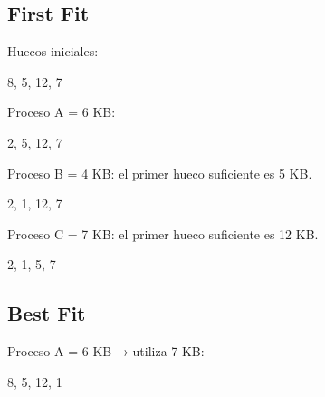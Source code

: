 \documentclass[
  spanish,
  letterpaper,
]{scrbook}
\newenvironment{Shaded}{\begin{snugshade}}{\end{snugshade}}
\newcommand{\NormalTok}[1]{\textcolor[rgb]{0.00,0.23,0.31}{#1}}
\begin{document}
\begin{tcolorbox}[enhanced jigsaw, arc=.35mm, bottomrule=.15mm, bottomtitle=1mm, breakable, colback=white, colbacktitle=quarto-callout-tip-color!10!white, colframe=quarto-callout-tip-color-frame, coltitle=black, left=2mm, leftrule=.75mm, opacityback=0, opacitybacktitle=0.6, rightrule=.15mm, title=\textcolor{quarto-callout-tip-color}{\faLightbulb}\hspace{0.5em}{✅ Solución propuesta}, titlerule=0mm, toprule=.15mm, toptitle=1mm]

\subsection{First Fit}\label{first-fit}

Huecos iniciales:

\begin{Shaded}
\begin{Highlighting}[]
\NormalTok{8, 5, 12, 7}
\end{Highlighting}
\end{Shaded}

Proceso A = 6 KB:

\begin{Shaded}
\begin{Highlighting}[]
\NormalTok{2, 5, 12, 7}
\end{Highlighting}
\end{Shaded}

Proceso B = 4 KB: el primer hueco suficiente es 5 KB.

\begin{Shaded}
\begin{Highlighting}[]
\NormalTok{2, 1, 12, 7}
\end{Highlighting}
\end{Shaded}

Proceso C = 7 KB: el primer hueco suficiente es 12 KB.

\begin{Shaded}
\begin{Highlighting}[]
\NormalTok{2, 1, 5, 7}
\end{Highlighting}
\end{Shaded}

\subsection{Best Fit}\label{best-fit}

Proceso A = 6 KB → utiliza 7 KB:

\begin{Shaded}
\begin{Highlighting}[]
\NormalTok{8, 5, 12, 1}
\end{Highlighting}
\end{Shaded}


\end{tcolorbox}
\end{document}
